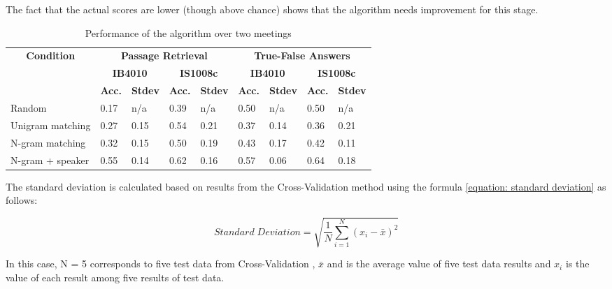 The fact that the actual scores are lower (though above chance) shows that the algorithm needs improvement for this stage.


\begin{table}[htbp]
\caption{Performance of the algorithm over two meetings}
\begin{center}
\begin{tabular}{|l|l|l|l|l|l|l|l|l|}
\hline
\multicolumn{ 1}{|c|}{\textbf{Condition}} & \multicolumn{ 4}{c|}{\textbf{Passage Retrieval}} & \multicolumn{ 4}{c|}{\textbf{True-False Answers}} \\ \cline{ 2- 9}
\multicolumn{ 1}{|c|}{} & \multicolumn{ 2}{c|}{\textbf{IB4010}} & \multicolumn{ 2}{c|}{\textbf{IS1008c}} & \multicolumn{ 2}{c|}{\textbf{IB4010}} & \multicolumn{ 2}{c|}{\textbf{IS1008c}} \\ \cline{ 2- 9}
\multicolumn{ 1}{|c|}{} & \multicolumn{1}{c|}{\textbf{Acc.}} & \multicolumn{1}{c|}{\textbf{Stdev}} & \multicolumn{1}{c|}{\textbf{Acc.}} & \multicolumn{1}{c|}{\textbf{Stdev}} & \multicolumn{1}{c|}{\textbf{Acc.}} & \multicolumn{1}{c|}{\textbf{Stdev}} & \multicolumn{1}{c|}{\textbf{Acc.}} & \multicolumn{1}{c|}{\textbf{Stdev}} \\ \hline
Random & 0.17 & n/a & 0.39 & n/a & 0.50 & n/a & 0.50 & n/a \\ \hline
Unigram matching & 0.27 & 0.15 & 0.54 & 0.21 & 0.37 & 0.14 & 0.36 & 0.21 \\ \hline
N-gram matching & 0.32 & 0.15 & 0.50 & 0.19 & 0.43 & 0.17 & 0.42 & 0.11 \\ \hline
N-gram + speaker & 0.55 & 0.14 & 0.62 & 0.16 & 0.57 & 0.06 & 0.64 & 0.18 \\ \hline
\end{tabular}
\end{center}
\label{Performance of the algorithm over two meetings}
\end{table}


The standard deviation is calculated based on results from the Cross-Validation method using the formula \ref{equation: standard deviation} as follows:

\begin{equation}
\label{equation: standard deviation}
	Standard \; Deviation = \sqrt{\dfrac{1}{N} \sum_{i=1}^N (x_i -\bar{x} )^2 }
\end{equation}


In this case, N = 5 corresponds to five test data from Cross-Validation , \ensuremath{\bar{x}} and is the average value of five test data results and \ensuremath{x_i} is the value of each result among five results of test data.



